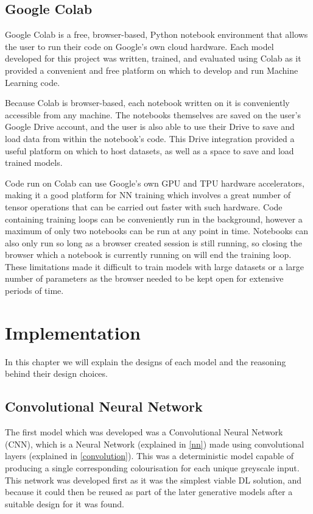 \documentclass{l4proj}
\begin{document}

\section{Google Colab}
Google Colab is a free, browser-based, Python notebook environment that allows the user to run their code on Google's own cloud hardware. Each model developed for this project was written, trained, and evaluated using Colab as it provided a convenient and free platform on which to develop and run Machine Learning code. 

Because Colab is browser-based, each notebook written on it is conveniently accessible from any machine. The notebooks themselves are saved on the user's Google Drive account, and the user is also able to use their Drive to save and load data from within the notebook's code. This Drive integration provided a useful platform on which to host datasets, as well as a space to save and load trained models.

Code run on Colab can use Google's own GPU and TPU hardware accelerators, making it a good platform for NN training which involves a great number of tensor operations that can be carried out faster with such hardware. Code containing training loops can be conveniently run in the background, however a maximum of only two notebooks can be run at any point in time. Notebooks can also only run so long as a browser created session is still running, so closing the browser which a notebook is currently running on will end the training loop. These limitations made it difficult to train models with large datasets or a large number of parameters as the browser needed to be kept open for extensive periods of time.

\chapter{Implementation}
In this chapter we will explain the designs of each model and the reasoning behind their design choices.

\section{Convolutional Neural Network}
\label{cnn-implementation}
The first model which was developed was a Convolutional Neural Network (CNN), which is a Neural Network (explained in \ref{nn}) made using convolutional layers (explained in \ref{convolution}). This was a deterministic model capable of producing a single corresponding colourisation for each unique greyscale input. This network was developed first as it was the simplest viable DL solution, and because it could then be reused as part of the later generative models after a suitable design for it was found.
\end{document}
